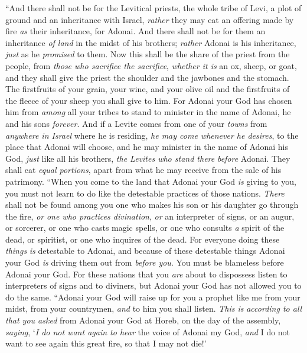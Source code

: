 \begin{biblechapter} %
\verse “And there shall not be for the Levitical priests, the whole tribe of Levi, a plot of ground and an inheritance with Israel, \textit{rather} they may eat an offering made by fire \textit{as} their inheritance, for Adonai.
\verse And there shall not be for them an inheritance \textit{of land} in the midst of his brothers; \textit{rather} Adonai is his inheritance, \textit{just} as he \textit{promised} to them.
\verse Now this shall be the share of the priest from the people, from \textit{those who sacrifice the sacrifice}, \textit{whether it is} an ox, sheep, or goat, and they shall give the priest the shoulder and the jawbones and the stomach.
\verse The firstfruits of your grain, your wine, and your olive oil and the firstfruits of the fleece of your sheep you shall give to him.
\verse For Adonai your God has chosen him from \textit{among} all your tribes to stand to minister in the name of Adonai, he and his sons \textit{forever}.
\verse And if a Levite comes from one of your \textit{towns} from \textit{anywhere in Israel} where he is residing, \textit{he may come whenever he desires}, to the place that Adonai will choose,
\verse and he may minister in the name of Adonai his God, \textit{just} like all his brothers, \textit{the Levites who stand there} \textit{before} Adonai.
\verse They shall eat \textit{equal portions}, apart from what he may receive from the sale of his patrimony.
\verse “When you come to the land that Adonai your God \textit{is} giving to you, you must not learn to do like the detestable practices of those nations.
\verse \textit{There} shall not be found among you one who makes his son or his daughter go through the fire, \textit{or} \textit{one who practices divination}, \textit{or} an interpreter of signs, or an augur, or sorcerer,
\verse or one who casts magic spells, or one who consults \textit{a} spirit of the dead, or spiritist, or one who inquires of the dead.
\verse For everyone doing these \textit{things} \textit{is} detestable to Adonai, and because of these detestable things Adonai your God \textit{is} driving them out from \textit{before you}.
\verse You must be blameless before Adonai your God.
\verse For these nations that you \textit{are} about to dispossess listen to interpreters of signs and to diviners, but Adonai your God has not allowed you to do the same.
\verse “Adonai your God will raise up for you a prophet like me from your midst, from your countrymen, \textit{and} to him you shall listen.
\verse \textit{This is} \textit{according to all that you asked} from Adonai your God at Horeb, on the day of the assembly, \textit{saying}, ‘\textit{I do not want again to hear} the voice of Adonai my God, \textit{and} I do not want to see again this great fire, so that I may not die!’

\end{biblechapter}
